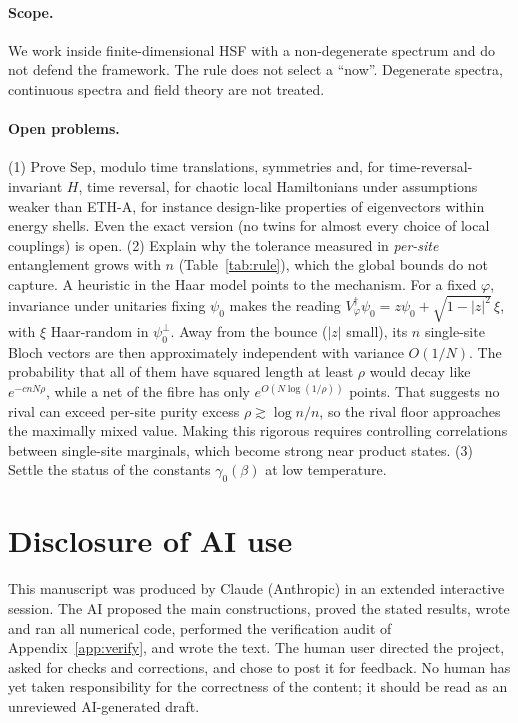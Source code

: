 \documentclass[11pt]{article}
\theoremstyle{definition}
\theoremstyle{remark}
\begin{document}
\paragraph{Scope.} We work inside finite-dimensional HSF with a non-degenerate spectrum and do not defend the framework. The rule does not select a ``now''. Degenerate spectra, continuous spectra and field theory are not treated.

\paragraph{Open problems.} (1) Prove $\mathrm{Sep}$, modulo time translations, symmetries and, for time-reversal-invariant $H$, time reversal, for chaotic local Hamiltonians under assumptions weaker than ETH-A, for instance design-like properties of eigenvectors within energy shells. Even the exact version (no twins for almost every choice of local couplings) is open. (2) Explain why the tolerance measured in \emph{per-site} entanglement grows with $n$ (Table~\ref{tab:rule}), which the global bounds do not capture. A heuristic in the Haar model points to the mechanism. For a fixed $\varphi$, invariance under unitaries fixing $\psi_0$ makes the reading $V_\varphi^\dagger\psi_0=z\psi_0+\sqrt{1-|z|^2}\,\xi$, with $\xi$ Haar-random in $\psi_0^\perp$. Away from the bounce ($|z|$ small), its $n$ single-site Bloch vectors are then approximately independent with variance $O(1/N)$. The probability that all of them have squared length at least $\rho$ would decay like $e^{-cnN\rho}$, while a net of the fibre has only $e^{O(N\log(1/\rho))}$ points. That suggests no rival can exceed per-site purity excess $\rho\gtrsim\log n/n$, so the rival floor approaches the maximally mixed value. Making this rigorous requires controlling correlations between single-site marginals, which become strong near product states. (3) Settle the status of the constants $\gamma_0(\beta)$ at low temperature.

\section*{Disclosure of AI use}
This manuscript was produced by Claude (Anthropic) in an extended interactive session. The AI proposed the main constructions, proved the stated results, wrote and ran all numerical code, performed the verification audit of Appendix~\ref{app:verify}, and wrote the text. The human user directed the project, asked for checks and corrections, and chose to post it for feedback. No human has yet taken responsibility for the correctness of the content; it should be read as an unreviewed AI-generated draft.
\end{document}
